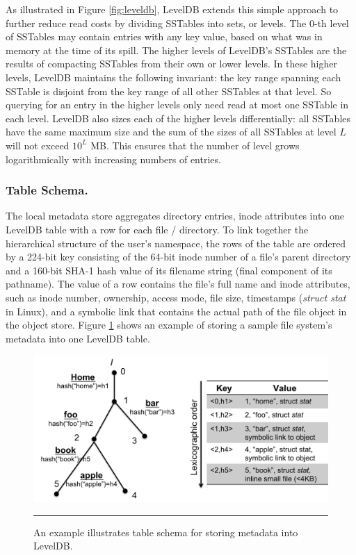 As illustrated in Figure \ref{fig:leveldb}, LevelDB extends this simple approach to further reduce read costs by dividing SSTables into sets, or levels.
The 0-th level of SSTables may contain entries with any key value, based on what was in memory at the time of its spill.
The higher levels of LevelDB's SSTables are the results of compacting SSTables from their own or lower levels.
In these higher levels, LevelDB maintains the following invariant: the key range spanning each SSTable is disjoint from the key range of all other SSTables at that level.
So querying for an entry in the higher levels only need read at most one SSTable in each level.
LevelDB also sizes each of the higher levels differentially:  all SSTables have the same maximum size and the sum of the sizes of all SSTables at level $L$ will not exceed $10^L$ MB.
This ensures that the number of level grows logarithmically with increasing numbers of entries.

\subsubsection*{Table Schema. } 

The local metadata store aggregates directory entries, 
inode attributes into one LevelDB table with a row for each file / directory.
To link together the hierarchical structure of the user's namespace,
the rows of the table are ordered by a 224-bit key consisting of 
the 64-bit inode number of a file's parent directory 
and a 160-bit SHA-1 hash value of its filename string (final component of its pathname).
The value of a row contains the file's full name and inode attributes,
such as inode number, ownership, access mode, file size, timestamps (\textit{struct stat} in Linux),
and a symbolic link that contains the actual path of the file object in the object store.
Figure \ref{fig:schema} shows an example of storing a sample file system's metadata into one LevelDB table.

\begin{figure}[t]
\centering
\includegraphics[scale=0.35]{figs/schema}
\caption{An example illustrates table schema for storing metadata into LevelDB.}
\vspace{10pt}
\hrule 
\label{fig:schema}
\end{figure}

